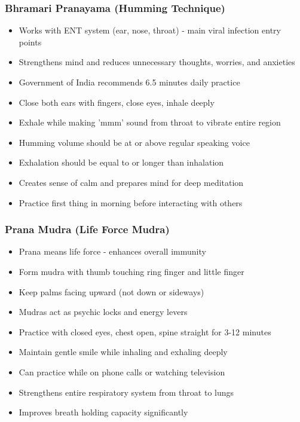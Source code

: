 \begin{frame}[fragile]\frametitle{Bhramari Pranayama (Humming Technique)}
      \begin{itemize}
	\item Works with ENT system (ear, nose, throat) - main viral infection entry points
	\item Strengthens mind and reduces unnecessary thoughts, worries, and anxieties
	\item Government of India recommends 6.5 minutes daily practice
	\item Close both ears with fingers, close eyes, inhale deeply
	\item Exhale while making 'mmm' sound from throat to vibrate entire region
	\item Humming volume should be at or above regular speaking voice
	\item Exhalation should be equal to or longer than inhalation
	\item Creates sense of calm and prepares mind for deep meditation
	\item Practice first thing in morning before interacting with others
	  \end{itemize}
\end{frame}

\begin{frame}[fragile]\frametitle{Prana Mudra (Life Force Mudra)}
      \begin{itemize}
	\item Prana means life force - enhances overall immunity
	\item Form mudra with thumb touching ring finger and little finger
	\item Keep palms facing upward (not down or sideways)
	\item Mudras act as psychic locks and energy levers
	\item Practice with closed eyes, chest open, spine straight for 3-12 minutes
	\item Maintain gentle smile while inhaling and exhaling deeply
	\item Can practice while on phone calls or watching television
	\item Strengthens entire respiratory system from throat to lungs
	\item Improves breath holding capacity significantly
	  \end{itemize}
\end{frame}

